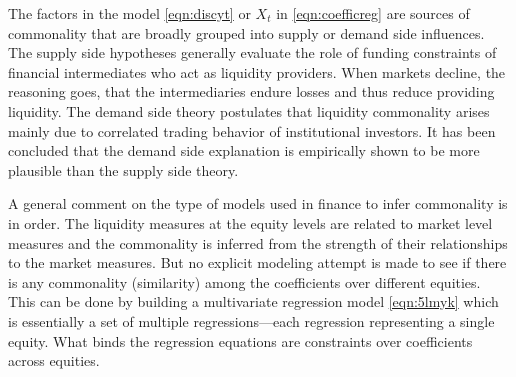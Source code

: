 The factors in the model \eqref{eqn:discyt} or $X_t$ in \eqref{eqn:coefficreg} are sources of commonality that are broadly grouped into supply or demand side influences. The supply side hypotheses generally evaluate the role of funding constraints of financial intermediates who act as liquidity providers. When markets decline, the reasoning goes, that the intermediaries endure losses and thus reduce providing liquidity. The demand side theory postulates that liquidity commonality arises mainly due to correlated trading behavior of institutional investors. It has been concluded that the demand side explanation is empirically shown to be more plausible than the supply side theory. 


A general comment on the type of models used in finance to infer commonality is in order. The liquidity measures at the equity levels are related to market level measures and the commonality is inferred from the strength of their relationships to the market measures. But no explicit modeling attempt is made to see if there is any commonality (similarity) among the coefficients over different equities. This can be done by building a multivariate regression model \eqref{eqn:5lmyk} which is essentially a set of multiple regressions---each regression representing a single equity. What binds the regression equations are constraints over coefficients across equities. 


